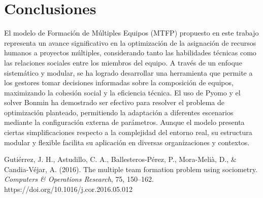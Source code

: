 \documentclass[conference]{IEEEtran}
\begin{document}
\section{Conclusiones}
El modelo de Formación de Múltiples Equipos (MTFP) propuesto en este trabajo representa un avance significativo en la optimización de la asignación de recursos humanos a proyectos múltiples, considerando tanto las habilidades técnicas como las relaciones sociales entre los miembros del equipo. A través de un enfoque sistemático y modular, se ha logrado desarrollar una herramienta que permite a los gestores tomar decisiones informadas sobre la composición de equipos, maximizando la cohesión social y la eficiencia técnica.
El uso de Pyomo y el solver Bonmin ha demostrado ser efectivo para resolver el problema de optimización planteado, permitiendo la adaptación a diferentes escenarios mediante la configuración externa de parámetros. Aunque el modelo presenta ciertas simplificaciones respecto a la complejidad del entorno real, su estructura modular y flexible facilita su aplicación en diversas organizaciones y contextos.


\begin{thebibliography}{00}

    Gutiérrez, J. H., Astudillo, C. A., Ballesteros-Pérez, P., Mora-Melià, D., \& Candia-Véjar, A. (2016).
    The multiple team formation problem using sociometry.
    \textit{Computers \& Operations Research}, 75, 150--162. https://doi.org/10.1016/j.cor.2016.05.012

\end{thebibliography}
\end{document}
